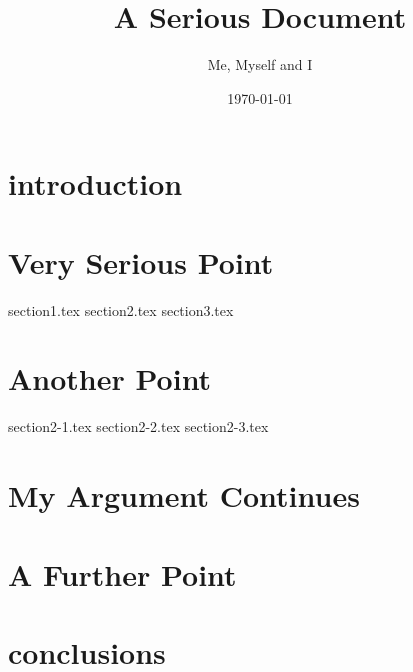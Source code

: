 \documentclass[a4paper, twocolumn]{report}
\title{A Serious Document}
\author{Me, Myself and I}
\date{\today}
\begin{document}
\maketitle

\tableofcontents
\pagebreak

\begin{abstract}

\end{abstract}

\chapter{introduction}


\chapter{Very Serious Point}
{section1.tex}
{section2.tex}
{section3.tex}

\chapter{Another Point}
{section2-1.tex}
{section2-2.tex}
{section2-3.tex}

\chapter{My Argument Continues}


\chapter{A Further Point}


\chapter{conclusions}

\appendix
\end{document}

